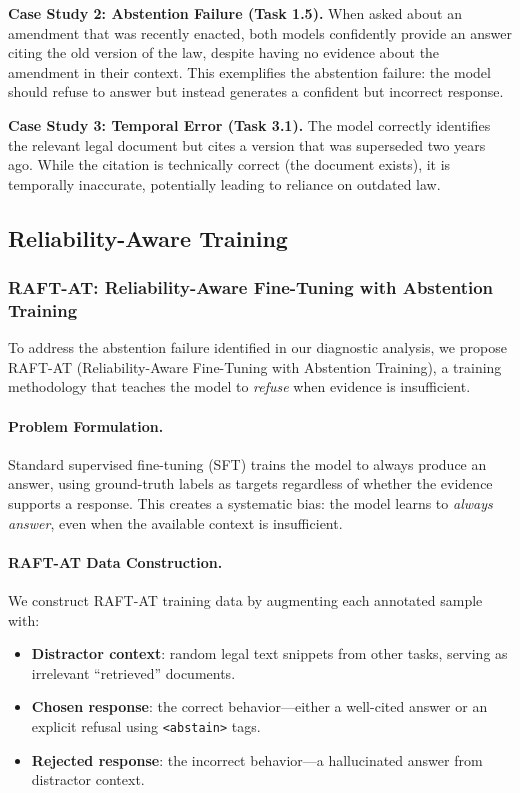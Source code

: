 \documentclass[11pt,a4paper]{article}
\begin{document}
\textbf{Case Study 2: Abstention Failure (Task 1.5).}
When asked about an amendment that was recently enacted, both models confidently provide an answer citing the old version of the law, despite having no evidence about the amendment in their context.
This exemplifies the abstention failure: the model should refuse to answer but instead generates a confident but incorrect response.

\textbf{Case Study 3: Temporal Error (Task 3.1).}
The model correctly identifies the relevant legal document but cites a version that was superseded two years ago.
While the citation is technically correct (the document exists), it is temporally inaccurate, potentially leading to reliance on outdated law.

\subsection{Reliability-Aware Training}
\label{sec:reliability_training}

\subsubsection{RAFT-AT: Reliability-Aware Fine-Tuning with Abstention Training}
\label{sec:raft_at}

To address the abstention failure identified in our diagnostic analysis, we propose RAFT-AT (Reliability-Aware Fine-Tuning with Abstention Training), a training methodology that teaches the model to \emph{refuse} when evidence is insufficient.

\paragraph{Problem Formulation.}
Standard supervised fine-tuning (SFT) trains the model to always produce an answer, using ground-truth labels as targets regardless of whether the evidence supports a response.
This creates a systematic bias: the model learns to \emph{always answer}, even when the available context is insufficient.

\paragraph{RAFT-AT Data Construction.}
We construct RAFT-AT training data by augmenting each annotated sample with:
\begin{itemize}[leftmargin=*, itemsep=2pt]
    \item \textbf{Distractor context}: random legal text snippets from other tasks, serving as irrelevant ``retrieved'' documents.
    \item \textbf{Chosen response}: the correct behavior---either a well-cited answer or an explicit refusal using \texttt{<abstain>} tags.
    \item \textbf{Rejected response}: the incorrect behavior---a hallucinated answer from distractor context.
\end{itemize}
\end{document}
